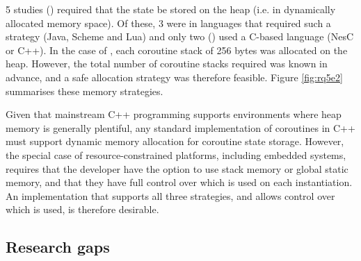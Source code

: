 \documentclass[format=acmsmall, review=false, screen=false]{acmart}
\begin{document}
5 studies (\cite{Motika2015, St-Amour2010, Park2015, Cohen2007b, Kalebe2017}) required that the state be stored on the heap (i.e. in dynamically allocated memory space).  Of these, 3 were in languages that required such a strategy (Java, Scheme and Lua) and only two (\cite{Cohen2007b, Kalebe2017}) used a C-based language (NesC or C++). In the case of \cite{Cohen2007b}, each coroutine stack of 256 bytes was allocated on the heap. However, the total number of coroutine stacks required was known in advance, and a safe allocation strategy was therefore feasible. Figure \ref{fig:rq5e2} summarises these memory strategies.

Given that mainstream C++ programming supports environments where heap memory is generally plentiful, any standard implementation of coroutines in C++ must support dynamic memory allocation for coroutine state storage. However, the special case of resource-constrained platforms, including embedded systems, requires that the developer have the option to use stack memory or global static memory, and that they have full control over which is used on each instantiation. An implementation that supports all three strategies, and allows control over which is used, is therefore desirable.%

\subsection{Research gaps}

\newenvironment{vheader}
{ \begin{sideways}\centering\begin{tabular}{c} }
{ \end{tabular}\end{sideways} }

\end{document}
